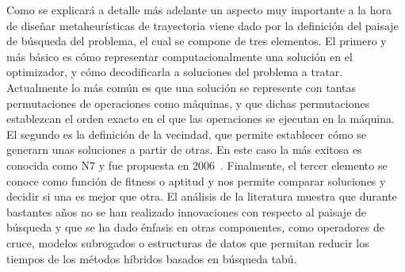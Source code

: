 Como se explicará a detalle más adelante un aspecto muy importante a la hora de diseñar metaheurísticas de trayectoria viene dado por la definición del
paisaje de búsqueda del problema, el cual se compone de tres elementos.
%
El primero y más básico es cómo representar computacionalmente una solución en el optimizador, y cómo decodificarla a soluciones del problema a tratar.
%
Actualmente lo más común es que una solución se represente con tantas permutaciones de operaciones como máquinas, y que dichas permutaciones establezcan
el orden exacto en el que las operaciones se ejecutan en la máquina.
%
El segundo es la definición de la vecindad, que permite establecer cómo se generarn unas soluciones a partir de otras.
%
En este caso la más exitosa es conocida como N7 y fue propuesta en 2006~\cite{Zhang2007}. 
%
Finalmente, el tercer elemento se conoce como función de fitness o aptitud y nos permite comparar soluciones y decidir si una es mejor que otra. 
%
El análisis de la literatura muestra que durante bastantes años no se han realizado innovaciones con respecto al paisaje de búsqueda y que se ha dado
énfasis en otras componentes, como operadores de cruce, modelos subrogados o estructuras de datos que permitan reducir los tiempos de los métodos híbridos
basados en búsqueda tabú.


